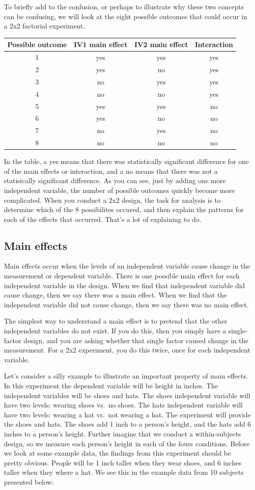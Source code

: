 To briefly add to the confusion, or perhaps to illustrate why these two
concepts can be confusing, we will look at the eight possible outcomes
that could occur in a 2x2 factorial experiment.

\begin{longtable}[]{@{}cccc@{}}
\toprule
Possible outcome & IV1 main effect & IV2 main effect &
Interaction\tabularnewline
\midrule
\endhead
1 & yes & yes & yes\tabularnewline
2 & yes & no & yes\tabularnewline
3 & no & yes & yes\tabularnewline
4 & no & no & yes\tabularnewline
5 & yes & yes & no\tabularnewline
6 & yes & no & no\tabularnewline
7 & no & yes & no\tabularnewline
8 & no & no & no\tabularnewline
\bottomrule
\end{longtable}

In the table, a yes means that there was statistically significant
difference for one of the main effects or interaction, and a no means
that there was not a statisically significant difference. As you can
see, just by adding one more independent variable, the number of
possible outcomes quickly become more complicated. When you conduct a
2x2 design, the task for analysis is to determine which of the 8
possibilites occured, and then explain the patterns for each of the
effects that occurred. That's a lot of explaining to do.

\subsection{Main effects}\label{main-effects}

Main effects occur when the levels of an independent variable cause
change in the measurement or dependent variable. There is one possible
main effect for each independent variable in the design. When we find
that independent variable did cause change, then we say there was a main
effect. When we find that the independent variable did not cause change,
then we say there was no main effect.

The simplest way to understand a main effect is to pretend that the
other independent variables do not exist. If you do this, then you
simply have a single-factor design, and you are asking whether that
single factor caused change in the measurement. For a 2x2 experiment,
you do this twice, once for each independent variable.

Let's consider a silly example to illustrate an important property of
main effects. In this experiment the dependent variable will be height
in inches. The independent variables will be shoes and hats. The shoes
independent variable will have two levels: wearing shoes vs.~no shoes.
The hats independent variable will have two levels: wearing a hat
vs.~not wearing a hat. The experiment will provide the shoes and hats.
The shoes add 1 inch to a person's height, and the hats add 6 inches to
a person's height. Further imagine that we conduct a within-subjects
design, so we measure each person's height in each of the fours
conditions. Before we look at some example data, the findings from this
experiment should be pretty obvious. People will be 1 inch taller when
they wear shoes, and 6 inches taller when they where a hat. We see this
in the example data from 10 subjects presented below:

